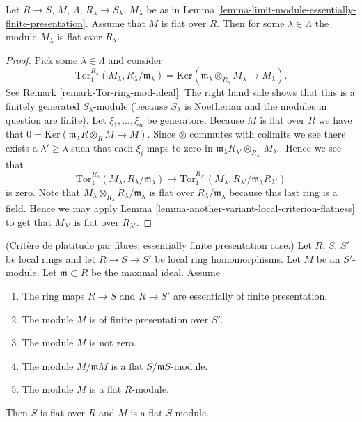 \begin{lemma}
\label{lemma-colimit-eventually-flat}
Let $R \to S$, $M$, $\Lambda$, $R_\lambda \to S_\lambda$, $M_\lambda$
be as in Lemma \ref{lemma-limit-module-essentially-finite-presentation}.
Assume that $M$ is flat over $R$.
Then for some $\lambda \in \Lambda$ the module
$M_\lambda$ is flat over $R_\lambda$.
\end{lemma}

\begin{proof}
Pick some $\lambda \in \Lambda$ and consider
$$
\text{Tor}_1^{R_\lambda}(M_\lambda, R_\lambda/\mathfrak m_\lambda)
=
\text{Ker}(\mathfrak m_\lambda \otimes_{R_\lambda} M_\lambda
\to M_\lambda).
$$
See Remark \ref{remark-Tor-ring-mod-ideal}. The right hand side
shows that this is a finitely generated $S_\lambda$-module (because
$S_\lambda$ is Noetherian and the modules in question are finite).
Let $\xi_1,\ldots,\xi_n$ be generators.
Because $M$ is flat over $R$ we
have that $0 = \text{Ker}(\mathfrak m_\lambda R \otimes_R M \to M)$.
Since $\otimes$ commutes with colimits we see there exists
a $\lambda' \geq \lambda$ such that each $\xi_i$ maps to
zero in
$\mathfrak m_{\lambda}R_{\lambda'} \otimes_{R_{\lambda'}} M_{\lambda'}$.
Hence we see that
$$
\text{Tor}_1^{R_\lambda}(M_\lambda, R_\lambda/\mathfrak m_\lambda)
\longrightarrow
\text{Tor}_1^{R_{\lambda'}}(M_\lambda,
R_{\lambda'}/\mathfrak m_{\lambda}R_{\lambda'})
$$
is zero. Note that
$M_\lambda \otimes_{R_\lambda} R_\lambda/\mathfrak m_\lambda$
is flat over $R_\lambda/\mathfrak m_\lambda$ because this last
ring is a field. Hence we may apply Lemma
\ref{lemma-another-variant-local-criterion-flatness}
to get that $M_{\lambda'}$ is flat over $R_{\lambda'}$.
\end{proof}

\begin{lemma}
\label{lemma-criterion-flatness-fibre}
(Crit\`ere de platitude par fibres; essentially finite presentation case.)
Let $R$, $S$, $S'$ be local rings and let $R \to S \to S'$ be local ring
homomorphisms. Let $M$ be an $S'$-module. Let $\mathfrak m \subset R$
be the maximal ideal. Assume
\begin{enumerate}
\item The ring maps $R \to S$ and $R \to S'$ are essentially
of finite presentation.
\item The module $M$ is of finite presentation over $S'$.
\item The module $M$ is not zero.
\item The module $M/\mathfrak mM$ is a flat $S/\mathfrak mS$-module.
\item The module $M$ is a flat $R$-module.
\end{enumerate}
Then $S$ is flat over $R$ and $M$ is a flat $S$-module.
\end{lemma}

